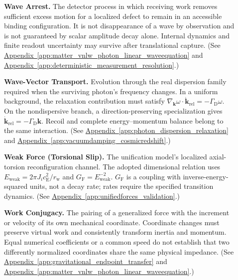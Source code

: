 \begin{description}
\item[] \begin{minipage}[t]{\linewidth}
\textbf{Wave Arrest.} The detector process in which receiving work removes sufficient excess motion for a localized defect to remain in an accessible binding configuration. It is not disappearance of a wave by observation and is not guaranteed by scalar amplitude decay alone. Internal dynamics and finite readout uncertainty may survive after translational capture.
(See \hyperref[app:matter_vnlw_photon_linear_waveequation]{Appendix~\ref*{app:matter_vnlw_photon_linear_waveequation}} and \hyperref[app:deterministic_measurement_resolution]{Appendix~\ref*{app:deterministic_measurement_resolution}}.)
\end{minipage}

\item[] \begin{minipage}[t]{\linewidth}
\textbf{Wave-Vector Transport.} Evolution through the real dispersion family required when the surviving photon's frequency changes. In a uniform background, the relaxation contribution must satisfy $\nabla_{\mathbf k}\omega\cdot\dot{\mathbf k}_{\mathrm{rel}}=-\Gamma_{\mathrm D}\omega$. On the nondispersive branch, a direction-preserving specialization gives $\dot{\mathbf k}_{\mathrm{rel}}=-\Gamma_{\mathrm D}\mathbf k$. Recoil and complete energy--momentum balance belong to the same interaction.
(See \hyperref[app:photon_dispersion_relaxation]{Appendix~\ref*{app:photon_dispersion_relaxation}} and \hyperref[app:vacuumdamping_cosmicredshift]{Appendix~\ref*{app:vacuumdamping_cosmicredshift}}.)
\end{minipage}

\item[] \begin{minipage}[t]{\linewidth}
\textbf{Weak Force (Torsional Slip).} The unification model's localized axial-torsion reconfiguration channel. The adopted dimensional relation uses $E_{\mathrm{weak}}=2\pi J_i c_{\mathrm E}^2/r_{\mathrm w}$ and $G_{\mathrm F}=E_{\mathrm{weak}}^{-2}$. $G_{\mathrm F}$ is a coupling with inverse-energy-squared units, not a decay rate; rates require the specified transition dynamics.
(See \hyperref[app:unifiedforces_validation]{Appendix~\ref*{app:unifiedforces_validation}}.)
\end{minipage}

\item[] \begin{minipage}[t]{\linewidth}
\textbf{Work Conjugacy.} The pairing of a generalized force with the increment or velocity of its own mechanical coordinate. Coordinate changes must preserve virtual work and consistently transform inertia and momentum. Equal numerical coefficients or a common speed do not establish that two differently normalized coordinates share the same physical impedance.
(See \hyperref[app:gravitational_endpoint_transfer]{Appendix~\ref*{app:gravitational_endpoint_transfer}} and \hyperref[app:matter_vnlw_photon_linear_waveequation]{Appendix~\ref*{app:matter_vnlw_photon_linear_waveequation}}.)
\end{minipage}


\end{description}
